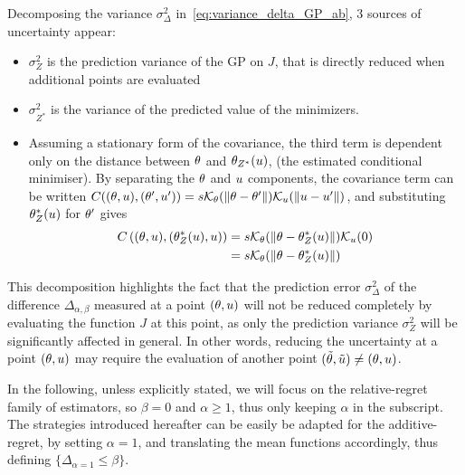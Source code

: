 \documentclass[../../Main_ManuscritThese.tex]{subfiles}
\begin{document}
Decomposing the variance $\sigma^2_{\Delta}$
in~\cref{eq:variance_delta_GP_ab}, 3 sources of uncertainty appear:
\begin{itemize}
\item $\sigma^2_{Z}$ is the prediction variance of the GP on $J$, that
  is directly reduced when additional points are evaluated
\item $\sigma^2_{Z^*}$ is the variance of the predicted value of the
  minimizers.
\item Assuming a stationary form of the covariance, the third term is
  dependent only on the distance between $\theta$ and $\theta_{Z^*}(u)$,
  (the estimated conditional minimiser). By separating the $\theta$ and
  $u$ components, the covariance term can be written
  $C((\theta,u), (\theta^{\prime},u^{\prime})) = s
  \mathcal{K}_{\theta}(\|\theta - \theta^{\prime}\|) \mathcal{K}_{u}(\|u -
  u^{\prime}\|)$, and
  substituting $\theta^*_Z(u)$ for $\theta^{\prime}$ gives
  \begin{align}
    C\left((\theta,u),(\theta^*_Z(u),u)\right) &= s  \mathcal{K}_{\theta}(\|\theta - \theta^*_Z(u)\|) \mathcal{K}_{u}(0) \\
                                                &= s  \mathcal{K}_{\theta}(\|\theta - \theta^*_Z(u)\|)
  \end{align}
\end{itemize}
This decomposition highlights the fact that the prediction error
$\sigma_{\Delta}^2$ of the difference $\Delta_{\alpha,\beta}$ measured
at a point $(\theta, u)$ will not be reduced completely by evaluating
the function $J$ at this point, as only the prediction variance
$\sigma_Z^2$ will be significantly affected in general. In other
words, reducing the uncertainty at a point $(\theta, u)$ may require
the evaluation of another point
$(\tilde{\theta},\tilde{u}) \neq (\theta, u)$.

In the following, unless explicitly stated, we will focus on the
relative-regret family of estimators, so $\beta=0$ and
$\alpha \geq 1$, thus only keeping $\alpha$ in the subscript.  The
strategies introduced hereafter can be easily be adapted for the
additive-regret, by setting $\alpha=1$, and translating the mean
functions accordingly, thus defining
$\{\Delta_{\alpha=1} \leq \beta \}$.


\end{document}
